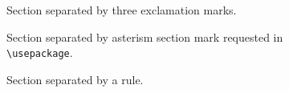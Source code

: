 \documentclass[12pt]{article}
\begin{document}
Section separated by three exclamation marks.
\sectionbreak[!!!]

Section separated by asterism section mark requested in\\ \texttt{\textbackslash usepackage}.
\sectionbreak

Section separated by a rule.
\sectionbreakmark{\rule{10em}{3pt}}
\sectionbreak
\end{document}
